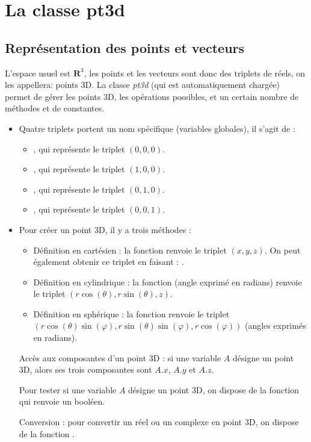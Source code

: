 \section{La classe pt3d}

\subsection{Représentation des points et vecteurs}

L'espace usuel est $\mathbf R^3$, les points et les vecteurs sont donc des triplets de réels, on les appellera: points 3D. La classe \emph{pt3d} (qui est automatiquement chargée) permet de gérer les points 3D, les opérations possibles, et un certain nombre de méthodes et de constantes.

\begin{itemize}
    \item  Quatre triplets portent un nom spécifique (variables globales), il s'agit de :
    \begin{itemize}
        \item {}, qui représente le triplet $(0,0,0)$.
        \item {}, qui représente le triplet $(1,0,0)$.
        \item {}, qui représente le triplet $(0,1,0)$.
        \item {}, qui représente le triplet $(0,0,1)$.
    \end{itemize}
    \item  Pour créer un point 3D, il y a trois méthodes :
        \begin{itemize}
            \item Définition en cartésien : la fonction  renvoie le triplet $(x,y,z)$. On peut également obtenir ce triplet en faisant : .
            \item Définition en cylindrique : la fonction  (angle exprimé en radians) renvoie le triplet $(r\cos(\theta),r\sin(\theta),z)$.
            \item Définition en sphérique : la fonction  renvoie le triplet $(r\cos(\theta)\sin(\varphi), r\sin(\theta)\sin(\varphi),r\cos(\varphi))$ (angles exprimés en radians).
        \end{itemize}
    Accès aux composantes d'un point 3D : si une variable $A$ désigne un point 3D, alors ses trois composantes sont $A.x$, $A.y$ et $A.z$.
    
    Pour tester si une variable $A$ désigne un point 3D, on dispose de la fonction  qui renvoie un booléen.
    
    Conversion : pour convertir un réel ou un complexe en point 3D, on dispose de la fonction .
\end{itemize}

